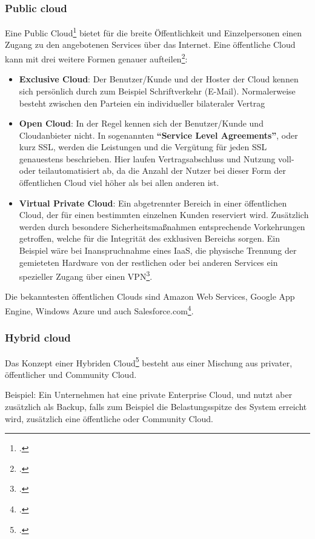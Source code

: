 \subsubsection{Public cloud}
Eine Public Cloud\footcite{cloud-ms-ph} bietet für die breite Öffentlichkeit und Einzelpersonen einen Zugang zu den angebotenen Services über das Internet. Eine öffentliche Cloud kann mit drei weitere Formen genauer aufteilen\footcite{Lehrunterlagen-HTL-cloud}:
\begin{itemize}
	\item \textbf{Exclusive Cloud}: Der Benutzer/Kunde und der Hoster der Cloud kennen sich persönlich durch zum Beispiel Schriftverkehr (E-Mail). Normalerweise besteht zwischen den Parteien ein individueller bilateraler Vertrag
	\item \textbf{Open Cloud}: In der Regel kennen sich der Benutzer/Kunde und Cloudanbieter nicht. In sogenannten \textbf{"`Service Level Agreements"'}, oder kurz SSL, werden die Leistungen und die Vergütung für jeden SSL genauestens beschrieben. Hier laufen Vertragsabschluss und Nutzung voll- oder teilautomatisiert ab, da die Anzahl der Nutzer bei dieser Form der öffentlichen Cloud viel höher als bei allen anderen ist.
	\item \textbf{Virtual Private Cloud}: Ein abgetrennter Bereich in einer öffentlichen Cloud, der für einen bestimmten einzelnen Kunden reserviert wird. Zusätzlich werden durch besondere Sicherheitsmaßnahmen entsprechende Vorkehrungen getroffen, welche für die Integrität des exklusiven Bereichs sorgen. Ein Beispiel wäre bei Inanspruchnahme eines IaaS, die physische Trennung der gemieteten Hardware von der restlichen oder bei anderen Services ein spezieller Zugang über einen VPN\footcite{Lehrunterlagen-HTL-cloud}.
\end{itemize}
Die bekanntesten öffentlichen Clouds sind Amazon Web Services, Google App Engine, Windows Azure und auch Salesforce.com\footcite{cloud-computing}.

\subsubsection{Hybrid cloud}
Das Konzept einer Hybriden Cloud\footcite{cloud-ms-ph} besteht aus einer Mischung aus privater, öffentlicher und Community Cloud.

Beispiel: Ein Unternehmen hat eine private Enterprise Cloud, und nutzt aber zusätzlich als Backup, falls zum Beispiel die Belastungsspitze des System erreicht wird, zusätzlich eine öffentliche oder Community Cloud.
